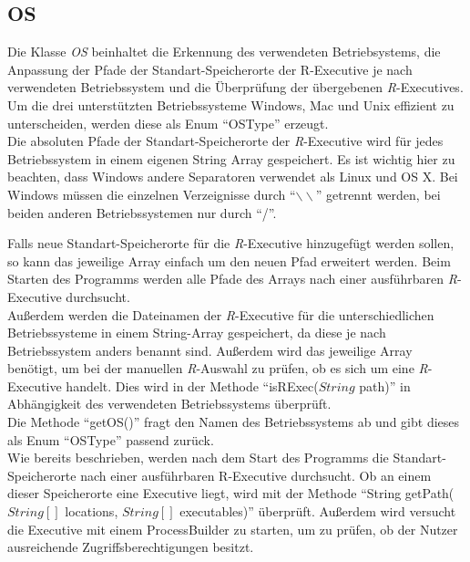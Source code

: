 \documentclass[a4paper, 12pt]{report} %
\begin{document}
\subsection{OS} \label{OS}

Die Klasse \textit{OS} beinhaltet die Erkennung des verwendeten Betriebsystems, die Anpassung der Pfade der Standart-Speicherorte der R-Executive je nach verwendeten Betriebssystem und die Überprüfung der übergebenen \textit{R}-Executives.\\

Um die drei unterstützten Betriebssysteme Windows, Mac und Unix effizient zu unterscheiden, werden diese als Enum "`OSType"' erzeugt.\\

Die absoluten Pfade der Standart-Speicherorte der \textit{R}-Executive wird für jedes Betriebssystem in einem eigenen String Array gespeichert. Es ist wichtig hier zu beachten, dass Windows andere Separatoren verwendet als Linux und OS X.
Bei Windows müssen die einzelnen Verzeignisse durch "`$\backslash \backslash$"' getrennt werden, bei beiden anderen Betriebssystemen nur durch "`/"'. 

Falls neue Standart-Speicherorte für die \textit{R}-Executive hinzugefügt werden sollen, so kann das jeweilige Array einfach um den neuen Pfad erweitert werden. Beim Starten des Programms werden alle Pfade des Arrays nach einer ausführbaren \textit{R}-Executive durchsucht.\\

Außerdem werden die Dateinamen der \textit{R}-Executive für die unterschiedlichen Betriebssysteme in einem String-Array gespeichert, da diese je nach Betriebssystem anders benannt sind. Außerdem wird das jeweilige Array benötigt, um bei der manuellen \textit{R}-Auswahl zu prüfen, ob es sich um eine \textit{R}-Executive handelt. Dies wird in der Methode "`isRExec($String$ path)"' in Abhängigkeit des verwendeten Betriebssystems überprüft.\\

Die Methode "`getOS()"' fragt den Namen des Betriebssystems ab und gibt dieses als Enum "`OSType"' passend zurück.\\

Wie bereits beschrieben, werden nach dem Start des Programms die Standart-Speicherorte nach einer ausführbaren R-Executive durchsucht. Ob an einem dieser Speicherorte eine Executive liegt, wird mit der Methode "`String getPath($String[]$ locations, $String[]$ executables)"' überprüft. Außerdem wird versucht die Executive mit einem ProcessBuilder zu starten, um zu prüfen, ob der Nutzer ausreichende Zugriffsberechtigungen besitzt.\\
\end{document}
